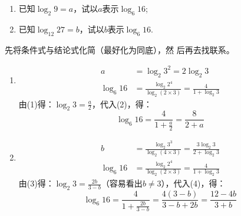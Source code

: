 \begin{example}
\begin{enumerate}[(1)]
    \item 已知$\log_2 9=a$，试以$a$表示$\log_6 16$;
    \item 已知$\log_{12} 27=b$，试以$b$表示$\log_6 16$.
\end{enumerate}
\end{example}

\begin{analyze}
    先将条件式与结论式化简（最好化为同底），然
后再去找联系。
\end{analyze}

\begin{solution}
\begin{enumerate}
    \item \begin{align}
        a&=\log_2 3^2 =2\log_2 3 \tag{1}\\
        \log_{6}16 &= \frac{\log_2 2^4}{\log_2(2\times 3)}=\frac{4}{1+\log_2 3}\tag{2}
    \end{align}
由(1)得：$\log_2 3=\frac{a}{2}$，代入(2)，得：
\[\log_6 16=\frac{4}{1+\frac{a}{2}}=\frac{8}{2+a}\]
\item \begin{align}
    b&=\frac{\log_2 3^3}{\log_2(4\times 3)}=\frac{3\log_2 3}{2+\log_2 3}\tag{3}\\
    \log_{6}16&=\frac{\log_2 2^4}{\log_2(2\times 3)}=\frac{4}{1+\log_2 3}\tag{4}
\end{align}
由(3)得：$\log_2 3=\frac{2b}{3-b}$（容易看出$b\ne 3$），代入(4)，得：
\[\log_6 16=\frac{4}{1+\frac{2b}{3-b}}=\frac{4(3-b)}{3-b+2b}=\frac{12-4b}{3+b}\]
\end{enumerate}
\end{solution}

